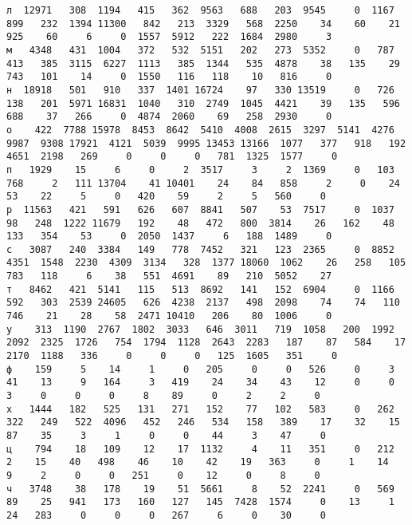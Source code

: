 \documentclass{article}
\begin{document}
\begin{landscape}
\begin{addmargin}{0em}
\begin{verbatim}
л  12971   308  1194   415   362  9563   688   203  9545     0  1167   899   232  1394 11300   842   213  3329   568  2250    34    60    21   925    60     6     0  1557  5912   222  1684  2980     3
м   4348   431  1004   372   532  5151   202   273  5352     0   787   413   385  3115  6227  1113   385  1344   535  4878    38   135    29   743   101    14     0  1550   116   118    10   816     0
н  18918   501   910   337  1401 16724    97   330 13519     0   726   138   201  5971 16831  1040   310  2749  1045  4421    39   135   596   688    37   266     0  4874  2060    69   258  2930     0
о    422  7788 15978  8453  8642  5410  4008  2615  3297  5141  4276  9987  9308 17921  4121  5039  9995 13453 13166  1077   377   918   192  4651  2198   269     0     0     0   781  1325  1577     0
п   1929    15     6     0     2  3517     3     2  1369     0   103   768     2   111 13704    41 10401    24    84   858     2     0    24    53    22     5     0   420    59     2     5   560     0
р  11563   421   591   626   607  8841   507    53  7517     0  1037    98   248  1222 11679   192    48   472   800  3814    26   162    48   133   354    53     0  2050  1437     6   188  1489     0
с   3087   240  3384   149   778  7452   321   123  2365     0  8852  4351  1548  2230  4309  3134   328  1377 18060  1062    26   258   105   783   118     6    38   551  4691    89   210  5052    27
т   8462   421  5141   115   513  8692   141   152  6904     0  1166   592   303  2539 24605   626  4238  2137   498  2098    74    74   110   746    21    28    58  2471 10410   206    80  1006     0
у    313  1190  2767  1802  3033   646  3011   719  1058   200  1992  2092  2325  1726   754  1794  1128  2643  2283   187    87   584    17  2170  1188   336     0     0     0   125  1605   351     0
ф    159     5    14     1     0   205     0     0   526     0     3    41    13     9   164     3   419    24    34    43    12     0     0     3     0     0     0     8    89     0     2     2     0
х   1444   182   525   131   271   152    77   102   583     0   262   322   249   522  4096   452   246   534   158   389    17    32    15    87    35     3     1     0     0    44     3    47     0
ц    794    18   109    12    17  1132     4    11   351     0   212     2    15    40   498    46    10    42    19   363     0     1    14     9     2     0     0   251     0    12     0     8     0
ч   3748    38   178    19    51  5661     8    52  2241     0   569    89    25   941   173   160   127   145  7428  1574     0    13     1    24   283     0     0     0   267     6     0    30     0

\end{verbatim}
\end{addmargin}
\end{landscape}
\end{document}
